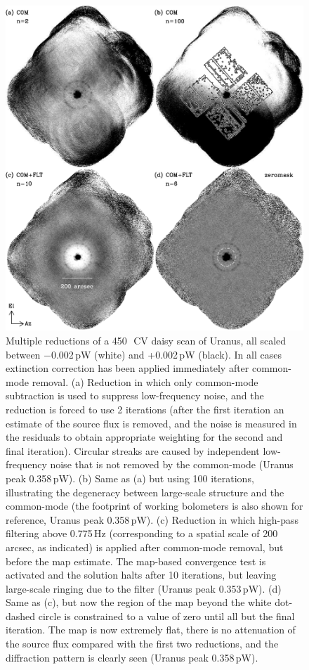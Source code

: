\documentclass[useAMS,usenatbib,nofootinbib]{mn2e}
\begin{document}
\begin{figure}
\centering
\includegraphics[width=\linewidth]{pointmaps}
\caption{Multiple reductions of a 450\,\micron\ CV daisy scan of
  Uranus, all scaled between $-$0.002\,pW (white) and +0.002\,pW
  (black). In all cases extinction correction has been applied
  immediately after common-mode removal. (a) Reduction in which only
  common-mode subtraction is used to suppress low-frequency noise, and
  the reduction is forced to use 2 iterations (after the first
  iteration an estimate of the source flux is removed, and the noise
  is measured in the residuals to obtain appropriate weighting for the
  second and final iteration). Circular streaks are caused by
  independent low-frequency noise that is not removed by the
  common-mode (Uranus peak 0.358\,pW). (b) Same as (a) but using 100
  iterations, illustrating the degeneracy between large-scale
  structure and the common-mode (the footprint of working bolometers
  is also shown for reference, Uranus peak 0.358\,pW). (c) Reduction
  in which high-pass filtering above 0.775\,Hz (corresponding to a
  spatial scale of 200\,arcsec, as indicated) is applied after
  common-mode removal, but before the map estimate. The map-based
  convergence test is activated and the solution halts after 10
  iterations, but leaving large-scale ringing due to the filter
  (Uranus peak 0.353\,pW). (d) Same as (c), but now the region of the
  map beyond the white dot-dashed circle is constrained to a value of
  zero until all but the final iteration.  The map is now extremely
  flat, there is no attenuation of the source flux compared with the
  first two reductions, and the diffraction pattern is clearly seen
  (Uranus peak 0.358\,pW).  }
\label{fig:pointmaps}
\end{figure}
\end{document}
